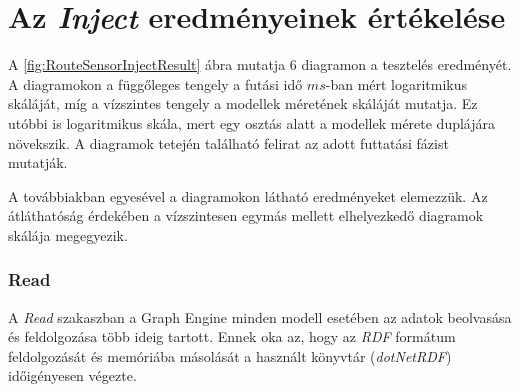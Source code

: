 \section{Az \emph{Inject} eredményeinek értékelése}

A \ref{fig:RouteSensorInjectResult} ábra mutatja 6 diagramon a tesztelés eredményét. A diagramokon a függőleges tengely a futási idő $ms$-ban mért logaritmikus skáláját, míg a vízszintes tengely a modellek méretének skáláját mutatja. Ez utóbbi is logaritmikus skála, mert egy osztás alatt a modellek mérete duplájára növekszik. A diagramok tetején található felirat az adott futtatási fázist mutatják.

A továbbiakban egyesével a diagramokon látható eredményeket elemezzük. Az átláthatóság érdekében a vízszintesen egymás mellett elhelyezkedő diagramok skálája megegyezik.

\subsubsection{Read}

A \emph{Read} szakaszban a Graph Engine minden modell esetében az adatok beolvasása és feldolgozása több ideig tartott. Ennek oka az, hogy az \emph{RDF} formátum feldolgozását és memóriába másolását a használt könyvtár (\emph{dotNetRDF}) időigényesen végezte.

